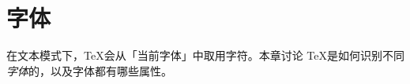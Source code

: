 \documentclass{book}
\begin{document}
\chapter{字体}\label{font}

在文本模式下，\TeX 会从「当前字体」中取用字符。本章讨论 \TeX 是如何识别不同\emph{字体}的，以及字体都有哪些属性。

\label{cschap:font}\label{cschap:fontname}\label{cschap:nullfont}\label{cschap:hyphenchar}\label{cschap:defaulthyphenchar}\label{cschap:fontdimen}\label{cschap:char47}\label{cschap:noboundary}
\end{document}
